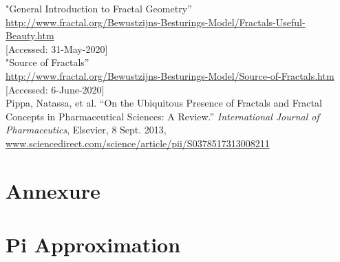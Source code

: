 \documentclass{resonance}
\begin{document}
\begin{thebibliography}{99}
"General Introduction to Fractal Geometry”\\ \textcolor{blue}{\url{http://www.fractal.org/Bewustzijns-Besturings-Model/Fractals-Useful-Beauty.htm}}\\
{[Accessed: 31-May-2020]}\\

"Source of Fractals”\\ \textcolor{blue}{\url{http://www.fractal.org/Bewustzijns-Besturings-Model/Source-of-Fractals.htm}}\\
{[Accessed: 6-June-2020]}\\

Pippa, Natassa, et al. “On the Ubiquitous Presence of Fractals and Fractal Concepts in Pharmaceutical Sciences: A Review.” \textit{International Journal of Pharmaceutics}, Elsevier, 8 Sept. 2013,\\
\textcolor{blue}{\url{www.sciencedirect.com/science/article/pii/S0378517313008211}}

\end{thebibliography}

\pagebreak

\setlength{\leftskip}{0cm}
\section*{Annexure}

\setcounter{section}{0}
\section{Pi Approximation}
\end{document}
